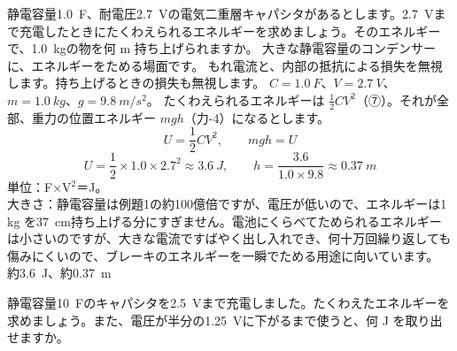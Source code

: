 \label{ph:電-3:ex7}
\begin{phreidai}[電気二重層キャパシタのエネルギー]
静電容量\qty{1.0}{F}、耐電圧\qty{2.7}{V}の電気二重層キャパシタがあるとします。\qty{2.7}{V}まで充電したときにたくわえられるエネルギーを求めましょう。そのエネルギーで、\qty{1.0}{kg}の物を何 m 持ち上げられますか。
\phbamen
大きな静電容量のコンデンサーに、エネルギーをためる場面です。
\phmushi
もれ電流と、内部の抵抗による損失を無視します。持ち上げるときの損失も無視します。
\phzu
$C=\qty{1.0}{F}$、$V=\qty{2.7}{V}$、$m=\qty{1.0}{kg}$、$g=\qty{9.8}{m/s^2}$。
\phriyu
たくわえられるエネルギーは $\tfrac12CV^2$（⑦）。それが全部、重力の位置エネルギー $mgh$（力-4）になるとします。
\phtateru
\[U=\frac12CV^2,\qquad mgh=U\]
\phtoku
\[U=\frac12\times1.0\times2.7^2\approx\qty{3.6}{J},\qquad h=\frac{3.6}{1.0\times9.8}\approx\qty{0.37}{m}\]
\phtashikame
単位：F×V$^2$＝J。\\
大きさ：静電容量は例題1の約100億倍ですが、電圧が低いので、エネルギーは1 kg を\qty{37}{cm}持ち上げる分にすぎません。電池にくらべてためられるエネルギーは小さいのですが、大きな電流ですばやく出し入れでき、何十万回繰り返しても傷みにくいので、ブレーキのエネルギーを一瞬でためる用途に向いています。
\kotae 約\qty{3.6}{J}、約\qty{0.37}{m}
\end{phreidai}
\begin{jibun}
静電容量\qty{10}{F}のキャパシタを\qty{2.5}{V}まで充電しました。たくわえたエネルギーを求めましょう。また、電圧が半分の\qty{1.25}{V}に下がるまで使うと、何 J を取り出せますか。
\end{jibun}

